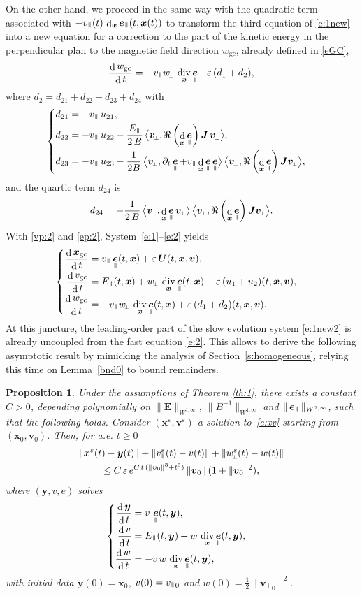 \documentclass[JEP,XML,SOM,Unicode]{cedram}
\newenvironment{splitcases}
{\begin{cases}\begin{aligned}}
{\end{aligned}\end{cases}}
\newcommand{\sperp}{{\scriptscriptstyle\perp}}
\newcommand{\blangle}{\bigl\langle}
\newcommand{\brangle}{\bigr\rangle}
\let\eps\varepsilon
\let\d\partial
\DeclareMathOperator\dD{d}\let\dd\dD
\DeclareMathOperator{\Div}{div}
\theoremstyle{plain}
\newtheorem{proposition}[theorem]{Proposition}
\theoremstyle{definition}
\newcommand{\be}{\begin{equation}}
\newcommand{\ee}{\end{equation}}
\newcommand{\bpr}{\begin{proposition}}
\newcommand{\epr}{\end{proposition}}
\newcommand\bE{{\boldsymbol E}}
\newcommand\bJ{{\boldsymbol J}}
\newcommand\bU{{\boldsymbol U}}
\newcommand\bfv{{\boldsymbol v}}
\newcommand\bfx{{\boldsymbol x}}
\newcommand\bfy{{\boldsymbol y}}
\DeclareMathOperator{\beD}{\boldsymbol{e}}
\newcommand\eDpar{\beD_\mypar}
\newcommand\vpar{v_\mypar}
\newcommand\bvperp{\bfv_{\!\sperp}}
\newcommand\eperp{w_{\!\sperp}}
\let\e w
\newcommand\Epar{E_\mypar}
\newcommand{\GC}{\bfx_\mathrm{gc}}
\newcommand{\eGC}{w_\mathrm{gc}}
\newcommand{\vGC}{v_\mathrm{gc}}
\newcommand{\mypar}{{\mkern3mu\vphantom{\perp}\vrule depth 0pt\mkern2mu\vrule depth 0pt\mkern3mu}}
\begin{document}
On the other hand, we proceed in the same way with the quadratic term associated with
$-\vpar(t)\,\dD_{\bfx}\eDpar(t,\bfx(t))$ to transform the third
equation of \eqref{e:1new} into a new equation for a correction to the part of the kinetic energy in the perpendicular plan to the magnetic field direction $\eGC$, already defined in \eqref{eGC},
\be
\label{ep:2}
\frac{\dD\eGC }{\dD t} =-\vpar \eperp\, \Div_\bfx\eDpar+\eps \,(d_1+d_2),
\ee
where $d_2=d_{21}+d_{22}+d_{23}+d_{24}$ with
\[
\begin{splitcases}
 d_{21}&= -\vpar\,u_{21},
\\
 d_{22}&= -\vpar\,u_{22}
-
\frac{\Epar}{2\,B} \, \blangle \bvperp,\Re\left(\dD_\bfx \eDpar\right)\bJ\,\bvperp\brangle,
\\
 d_{23}&=-\vpar\,u_{23}- \frac{1}{2B}\,\blangle \bvperp ,
\d_t\eDpar+\vpar\dD_{\bfx}\eDpar\eDpar \brangle\,\blangle \bvperp,
\Re\left(\dD_\bfx \eDpar\right)\bJ\bvperp\brangle,
\end{splitcases}
\]
and the quartic term $d_{24}$ is
\[
 d_{24}= -\frac{1}{2\,B}\, \blangle \bvperp ,
\dD_{\bfx}\eDpar\bvperp \brangle\, \blangle \bvperp,
{\Re\left(\dD_\bfx \eDpar\right)\bJ}\bvperp\brangle.
\]
With \eqref{vp:2} and \eqref{ep:2}, System~\eqref{e:1}--\eqref{e:2} yields
\be
\label{e:1new2}
\begin{splitcases}

\frac{\dD\GC}{\dD t}&=\vpar\eDpar(t,\bfx) +\eps \,\bU(t,\bfx,\bfv),
\\
\frac{\dD \vGC}{\dD t}&=\Epar(t,\bfx)+\eperp\, \Div_\bfx\eDpar(t,\bfx)
+\eps\,(u_1 +u_2)(t,\bfx,\bfv),
\\
 \frac{\dD \eGC}{\dD t}&=
-\vpar \eperp\, \Div_\bfx\eDpar(t,\bfx) +\eps \,(d_1+d_2) (t,\bfx,\bfv).
\end{splitcases}
\ee
At this juncture, the leading-order part of the slow evolution system \eqref{e:1new2} is already uncoupled from the fast equation \eqref{e:2}. This allows to derive the following asymptotic result by mimicking the analysis of Section~\ref{s:homogeneous}, relying this time on Lemma~\ref{bnd0} to bound remainders.

\bpr
\label{1st-xve}
Under the assumptions of Theorem \ref{th:1}, there exists a constant $C>0$, depending
polynomially on $\|\bE\|_{W^{1,\infty}}$, $\|B^{-1}\|_{W^{1,\infty}}$ and $\|\eDpar\|_{W^{2,\infty}}$, such that the following holds. Consider $(\bfx^\eps,\bfv^\eps)$ a solution to~\eqref{e:xv} starting from $(\bfx_0,\bfv_0)$. Then, for a.e. $t\geq0 $
\begin{multline*}
\|\bfx^\eps(t)-\bfy(t)\|
+\|\vpar^\eps(t)-v(t)\|
+\|\eperp^\eps(t)-\e(t)\|\\
\leq C\,\eps\,e^{C\,t\,(\|\bfv_0\|^3+t^3)}
\,\|\bfv_0\|\,(1+\|\bfv_0\|^2),
\end{multline*}
where $(\bfy,v,e)$ solves
\[
\begin{splitcases}
\frac{\dD\bfy}{\dD t} &=v\,\eDpar(t,\bfy),\\
\frac{\dD v}{\dD t}&=\Epar(t,\bfy)+\e\, \Div_\bfx\eDpar(t,\bfy),\\
\frac{\dD \e}{\dD t}&=
-v\,\e\, \Div_\bfx\eDpar(t,\bfy),
\end{splitcases}
\]
with initial data $\bfy(0)=\bfx_0$, $v(0)={\vpar}_{0}$ and $\e(0)=\tfrac12\|{\bvperp}_0\|^2$.
\epr
\end{document}
